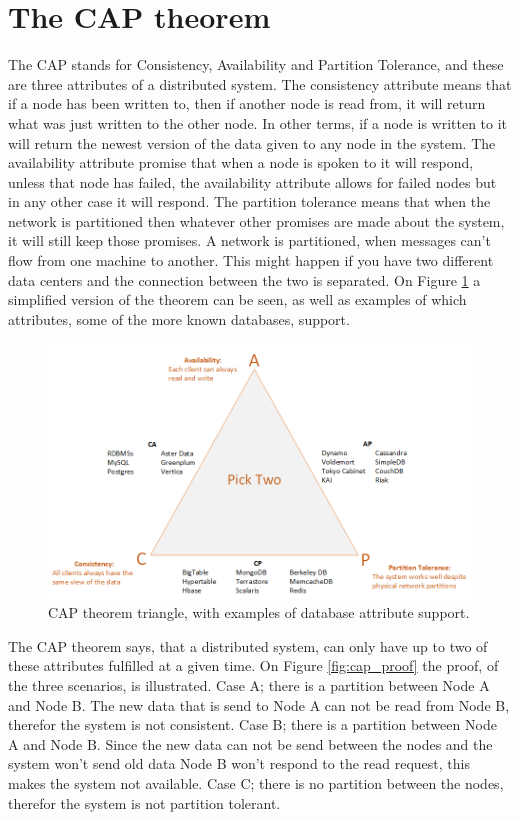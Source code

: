 \section{The CAP theorem}
The CAP stands for Consistency, Availability and Partition Tolerance, and these are three attributes of a distributed system. The consistency attribute means that if a node has been written to, then if another node is read from, it will return what was just written to the other node. In other terms, if a node is written to it will return the newest version of the data given to any node in the system. The availability attribute promise that when a node is spoken to it will respond, unless that node has failed, the availability attribute allows for failed nodes but in any other case it will respond. The partition tolerance means that when the network is partitioned then whatever other promises are made about the system, it will still keep those promises. A network is partitioned, when messages can't flow from one machine to another. This might happen if you have two different data centers and the connection between the two is separated. On Figure \ref{fig:cap_triangle} a simplified version of the theorem can be seen, as well as examples of which attributes, some  of the more known databases, support.

\begin{figure}[h!]
	\centering
	\includegraphics[scale=0.5]{consistency/fig/cap_triangle.png}
	\caption{CAP theorem triangle, with examples of database attribute support.}
	\label{fig:cap_triangle}
\end{figure}

The CAP theorem says, that a distributed system, can only have up to two of these attributes fulfilled at a given time. On Figure \ref{fig:cap_proof} the proof, of the three scenarios, is illustrated. Case A; there is a partition between Node A and Node B. The new data that is send to Node A can not be read from Node B, therefor the system is not consistent. Case B; there is a partition between Node A and Node B. Since the new data can not be send between the nodes and the system won't send old data Node B won't respond to the read request, this makes the system not available. Case C; there is no partition between the nodes, therefor the system is not partition tolerant.

